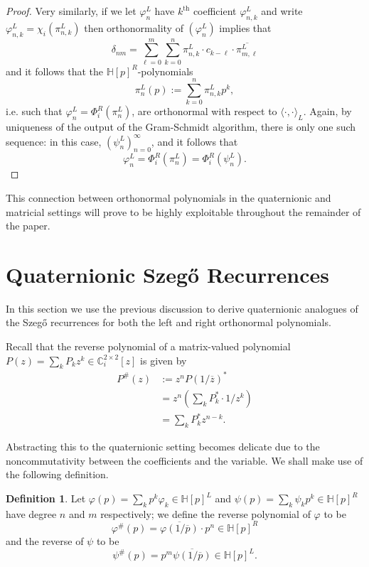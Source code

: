 \documentclass[11pt,reqno]{amsart}
\def\x{\chi}
\def\p{\varphi}
\def\q{\psi}
\def\d{\delta}
\def\P{\Phi}
\def\CC{\mathbb{C}}
\def\HH{\mathbb{H}}
\theoremstyle{definition}
\newtheorem{definition}[theorem]{Definition}
\numberwithin{equation}{section}
\begin{document}
\begin{proof}
    Very similarly, if we let \(\p_n^L\) have \(k^{\mathrm{th}}\) coefficient \(\p_{n,k}^L\) and write \(\p_{n,k}^L = \x_i(\pi_{n,k}^L)\) then orthonormality of \((\p_n^L)\) implies that
    \[
        \d_{nm} = \sum_{\ell=0}^m \sum_{k=0}^n \pi_{n,k}^L \cdot c_{k-\ell} \cdot \overline{\pi_{m,\ell}^L}
    \]
    and it follows that the \(\HH[p]^R\)-polynomials
    \[
        \pi_n^L(p) := \sum_{k=0}^n \pi_{n,k}^L p^k,
    \]
    i.e. such that \(\p_n^L = \P_i^R(\pi_n^L)\), are orthonormal with respect to \(\langle \cdot, \cdot \rangle_L\). Again, by uniqueness of the output of the Gram-Schmidt algorithm, there is only one such sequence: in this case, \((\q_n^L)_{n=0}^{\infty}\), and it follows that
    \[
        \p_n^L = \P_i^R(\pi_n^L) = \P_i^R(\q_n^L).
    \]
\end{proof}

This connection between orthonormal polynomials in the quaternionic and matricial settings will prove to be highly exploitable throughout the remainder of the paper.

\section{Quaternionic Szeg\H{o} Recurrences}

In this section we use the previous discussion to derive quaternionic analogues of the Szeg\H{o} recurrences for both the left and right orthonormal polynomials.

Recall that the reverse polynomial of a matrix-valued polynomial \(P(z) = \sum_k P_k z^k \in \CC_i^{2\times2}[z]\) is given by
\begin{align*}
    P^{\#}(z) & := z^n P(1/\overline{z})^* \\
    & = z^n (\sum_k P_k^* \cdot 1/z^k) \\
    & = \sum_k P_k^* z^{n-k}.
\end{align*}

Abstracting this to the quaternionic setting becomes delicate due to the noncommutativity between the coefficients and the variable. We shall make use of the following definition.

\begin{definition}
	Let \(\p(p) = \sum_k p^k \p_k \in \HH[p]^L\) and \(\q(p) = \sum_k \q_k p^k \in \HH[p]^R\) have degree \(n\) and \(m\) respectively; we define the reverse polynomial of \(\p\) to be
	\[
	    \p^{\#}(p) = \overline{\p(1/\overline{p})} \cdot p^n \in \HH[p]^R
	\]
	and the reverse of \(\q\) to be
	\[
	    \q^{\#}(p) = p^m \overline{\q(1/\overline{p})} \in \HH[p]^L.
	\]
\end{definition}
\end{document}
